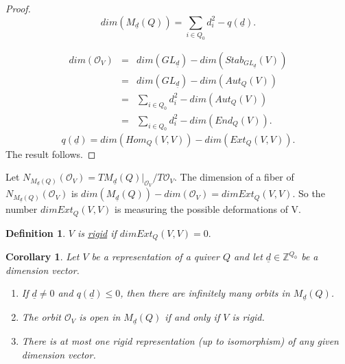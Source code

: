 \documentclass{book}
\newtheorem{corollary}[theorem]{Corollary}
\newtheorem{definition}[theorem]{Definition}
\begin{document}
		\begin{proof}
			$$dim(M_{\underline{d}}(Q)) =  \displaystyle \sum_{i \in Q_0} d_i^2 - q(\underline{d}) .$$

			\begin{eqnarray*}
				dim(\mathcal{O}_V) &=&  dim(GL_{\underline{d}}) - dim(Stab_{GL_{\underline{d}}}(V)) \\
							&=&   dim(GL_{\underline{d}}) - dim(Aut_{Q}(V)) \\
							&=&  \displaystyle \sum_{i \in Q_0} d_i^2  - dim(Aut_{Q}(V)) \\
							&=&  \displaystyle \sum_{i \in Q_0} d_i^2  - dim(End_{Q}(V)). 
			\end{eqnarray*}
			$$q(\underline{d}) = dim(Hom_Q(V,V)) - dim(Ext_Q(V,V)).$$
			The result follows.
		\end{proof}

		Let $N_{M_{\underline{d}}(Q)}(\mathcal{O}_V) = TM_{\underline{d}}(Q)|_{\mathcal{O}_V} /T\mathcal{O}_V$. The dimension of a fiber of $N_{M_{\underline{d}}(Q)}(\mathcal{O}_V)$ is  $dim(M_{\underline{d}}(Q)) - dim (\mathcal{O}_V) = dim Ext_Q(V,V)$. So the number $dim Ext_Q(V,V)$ is measuring the possible deformations of V. 

		\begin{definition}
			$V$ is \underline{rigid} if  $dim Ext_Q(V,V)=0.$
		\end{definition} 
		
		\begin{corollary}
Let $V$ be a representation of a quiver $Q$ and let $\underline{d}\in \mathbb{Z}^{Q_0}$ be a dimension vector.
\begin{enumerate}
\item If $\underline{d}\neq 0$ and $q(\underline{d})\leq 0$, then there are infinitely many orbits in $M_{\underline{d}}(Q)$.

\item The orbit $\mathcal{O}_V$ is open in $M_{\underline{d}}(Q)$ if and only if $V$ is rigid.

\item There is at most one rigid representation (up to isomorphism) of any given dimension vector.
\end{enumerate}
\end{corollary}
\end{document}
